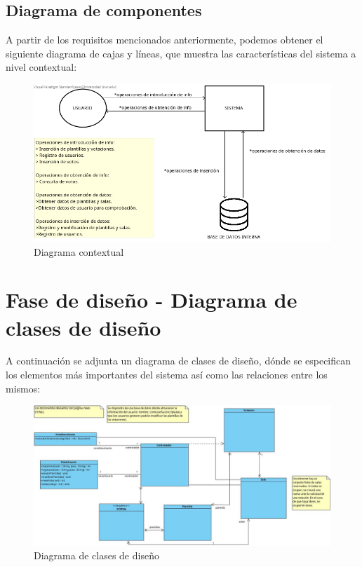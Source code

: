 \documentclass{article}
\begin{document}
	\subsection{Diagrama de componentes}
	A partir de los requisitos mencionados anteriormente, podemos obtener el siguiente diagrama de cajas y líneas, que muestra las características del sistema a nivel contextual:
	
	\begin{figure}[H]
		\centering
		\includegraphics[totalheight=7.5cm]{img/diagrama_cajas}
		\caption{Diagrama contextual}
	\end{figure}

	\section{Fase de diseño - Diagrama de clases de diseño}
	A continuación se adjunta un diagrama de clases de diseño, dónde se especifican los elementos más importantes del sistema así como las relaciones entre los mismos:
	
	\begin{figure}[H]
		\centering
		\includegraphics[totalheight=7cm]{img/5.jpg}
		\caption{Diagrama de clases de diseño}
	\end{figure}
	
\end{document}
